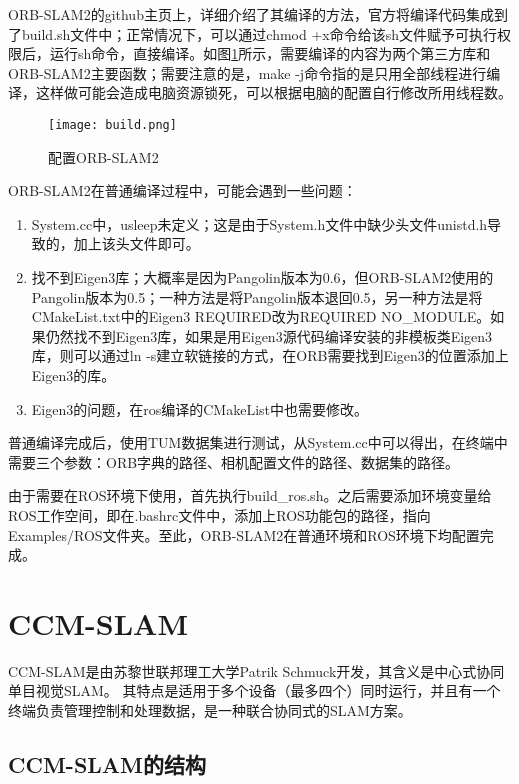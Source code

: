 ORB-SLAM2的github主页上，详细介绍了其编译的方法，官方将编译代码集成到了build.sh文件中；正常情况下，可以通过chmod +x命令给该sh文件赋予可执行权限后，运行sh命令，直接编译。如图\ref{fig10}所示，需要编译的内容为两个第三方库和ORB-SLAM2主要函数；需要注意的是，make -j命令指的是只用全部线程进行编译，这样做可能会造成电脑资源锁死，可以根据电脑的配置自行修改所用线程数。

\begin{figure}[!ht]
	\centering
	\texttt{[image: build.png]}
	\caption{配置ORB-SLAM2}
	\label{fig10}
\end{figure}

ORB-SLAM2在普通编译过程中，可能会遇到一些问题：
\begin{enumerate}
	\item System.cc中，usleep未定义；这是由于System.h文件中缺少头文件unistd.h导致的，加上该头文件即可。
	\item 
	找不到Eigen3库；大概率是因为Pangolin版本为0.6，但ORB-SLAM2使用的Pangolin版本为0.5；一种方法是将Pangolin版本退回0.5，另一种方法是将CMakeList.txt中的Eigen3 REQUIRED改为REQUIRED NO\_MODULE。如果仍然找不到Eigen3库，如果是用Eigen3源代码编译安装的非模板类Eigen3库，则可以通过ln -s建立软链接的方式，在ORB需要找到Eigen3的位置添加上Eigen3的库。
	\item 
	Eigen3的问题，在ros编译的CMakeList中也需要修改。
\end{enumerate}

普通编译完成后，使用TUM数据集进行测试，从System.cc中可以得出，在终端中需要三个参数：ORB字典的路径、相机配置文件的路径、数据集的路径。

由于需要在ROS环境下使用，首先执行build\_ros.sh。之后需要添加环境变量给ROS工作空间，即在.bashrc文件中，添加上ROS功能包的路径，指向Examples/ROS文件夹。至此，ORB-SLAM2在普通环境和ROS环境下均配置完成。

\section{CCM-SLAM}

CCM-SLAM是由苏黎世联邦理工大学Patrik Schmuck开发，其含义是中心式协同单目视觉SLAM。
其特点是适用于多个设备（最多四个）同时运行，并且有一个终端负责管理控制和处理数据，是一种联合协同式的SLAM方案。

\subsection{CCM-SLAM的结构} \label{3.3.1}

